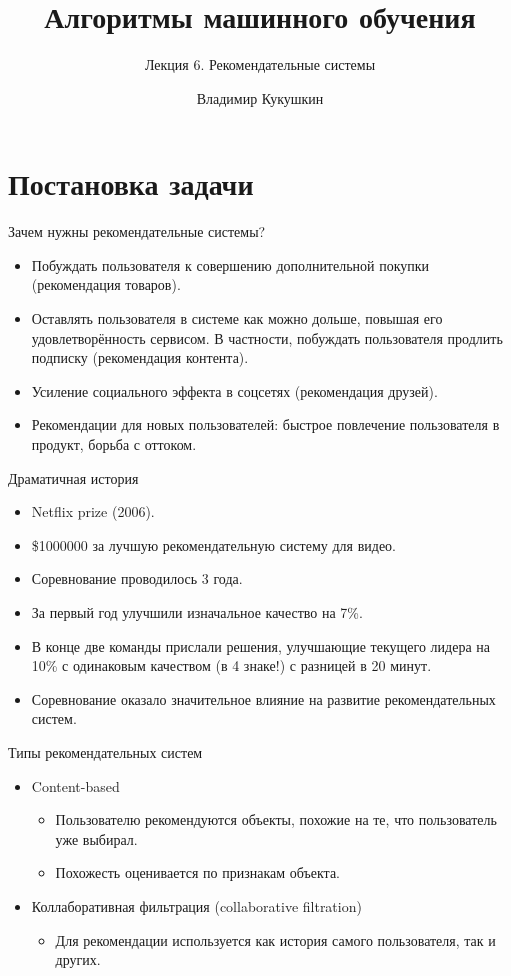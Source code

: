 \documentclass[9pt]{beamer}
\title{Алгоритмы машинного обучения}
\subtitle{Лекция 6. Рекомендательные системы}
\author{Владимир Кукушкин}
\institute{СПбГЭУ - 23.12.2020}
\begin{document}
\titlepage

\section{Постановка задачи}
\begin{frame}{Зачем нужны рекомендательные системы?}
    \begin{itemize}
        \item Побуждать пользователя к совершению дополнительной покупки (рекомендация товаров).
        \item Оставлять пользователя в системе как можно дольше, повышая его удовлетворённость сервисом. В частности, побуждать пользователя продлить подписку (рекомендация контента).
        \item Усиление социального эффекта в соцсетях (рекомендация друзей).
        \item Рекомендации для новых пользователей: быстрое повлечение пользователя в продукт, борьба с оттоком.
    \end{itemize}
\end{frame}

\begin{frame}{Драматичная история}
\begin{itemize}
    \item Netflix prize (2006).
    \item \$1000000 за лучшую рекомендательную систему для видео.
    \item Соревнование проводилось 3 года.
    \item За первый год улучшили изначальное качество на 7\%.
    \item В конце две команды прислали решения, улучшающие текущего лидера на 10\% с одинаковым качеством (в  4 знаке!) с разницей в 20 минут.
    \item Соревнование оказало значительное влияние на развитие рекомендательных систем.
\end{itemize}
\end{frame}

\begin{frame}{Типы рекомендательных систем}
\begin{itemize}
    \item Content-based
    \begin{itemize}
        \item Пользователю рекомендуются объекты, похожие на те, что пользователь уже выбирал.
        \item Похожесть оценивается по признакам объекта.
    \end{itemize}
    \item Коллаборативная фильтрация (collaborative filtration)
    \begin{itemize}
        \item Для рекомендации используется как история самого пользователя, так и других.
    \end{itemize}
\end{itemize}
\end{frame}
\end{document}
